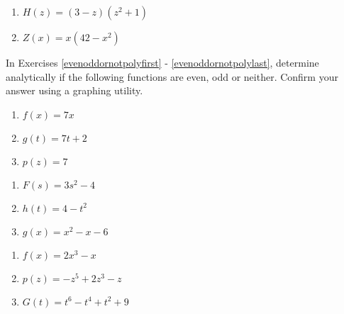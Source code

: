 \documentclass{ximera}
\begin{document}
\begin{multicols}{2}
\begin{enumerate}
\setcounter{enumi}{\value{HW}}

\item $H(z) = (3-z)(z^2+1)$
\item $Z(x) = x(42 - x^{2})$ \label{zeromultgraphlast}

\setcounter{HW}{\value{enumi}}
\end{enumerate}
\end{multicols}

In Exercises \ref{evenoddornotpolyfirst} - \ref{evenoddornotpolylast}, determine analytically if the following functions are even, odd or neither.  Confirm your answer using a graphing utility.


\begin{multicols}{3}
\begin{enumerate}
\setcounter{enumi}{\value{HW}}

\item $f(x) = 7x$ \label{evenoddornotpolyfirst}
\item $g(t) = 7t + 2$
\item $p(z) = 7$

\setcounter{HW}{\value{enumi}}
\end{enumerate}
\end{multicols}

\begin{multicols}{3}
\begin{enumerate}
\setcounter{enumi}{\value{HW}}

\item $F(s) = 3s^2 - 4$
\item $h(t) = 4-t^2$
\item $g(x) = x^2-x-6$

\setcounter{HW}{\value{enumi}}
\end{enumerate}
\end{multicols}


\begin{multicols}{3}
\begin{enumerate}
\setcounter{enumi}{\value{HW}}

\item $f(x) = 2x^3 - x$
\item $p(z) = -z^5 + 2z^3 - z$
\item $G(t) = t^{6} - t^{4} + t^{2} + 9$

\setcounter{HW}{\value{enumi}}
\end{enumerate}
\end{multicols}
\end{document}
